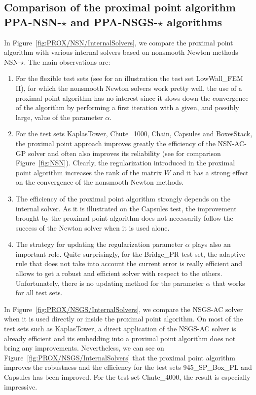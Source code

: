 \subsection{Comparison of the proximal point algorithm {\sf PPA-NSN-$\star$} and {\sf PPA-NSGS-$\star$}  algorithms}
\label{Sec:PROX/NSN/InternalSolvers}
In Figure~\ref{fig:PROX/NSN/InternalSolvers}, we compare the proximal point algorithm with various internal solvers based on nonsmooth Newton methods {\sf NSN-$\star$}. The main observations are:
\begin{enumerate}
\item For the flexible test sets (see for an illustration the test set LowWall\_FEM II), for which the nonsmooth Newton solvers work pretty well, the use of a proximal point algorithm has no interest since it slows down the convergence of the algorithm by performing a first iteration with a given, and possibly large, value of the parameter $\alpha$.
\item For the test sets KaplasTower,   Chute\_1000, Chain, Capsules and BoxesStack, the proximal point approach improves greatly the efficiency  of the {\sf NSN-AC-GP} solver and often also improves its reliability (see for comparison Figure~\ref{fig:NSN}). Clearly, the regularization introduced in the proximal point algorithm increases the rank of the matrix $W$ and it has a strong effect on the convergence of the nonsmooth  Newton methods.
\item The efficiency of the proximal point algorithm strongly depends on the internal solver. As it is illustrated on the Capsules test, the improvement brought by the proximal point algorithm does not necessarily follow the success of the Newton solver when it is used alone.
\item The strategy for updating the regularization parameter $\alpha$ plays also an important role. Quite surprisingly, for the Bridge\_PR test set, the adaptive rule that does not take into account the current error is really efficient and allows to get a robust and efficient solver with respect to the others. Unfortunately, there is no updating method for the parameter $\alpha$ that works for all test sets.
\end{enumerate}
In Figure~\ref{fig:PROX/NSGS/InternalSolvers}, we compare the {\sf NSGS-AC} solver when it is used directly or inside the proximal point algorithm. On most of the test sets such as KaplasTower, a direct application of the {\sf NSGS-AC} solver is already efficient and its embedding into a proximal point algorithm does not bring any improvements. Nevertheless, we can see on Figure~\ref{fig:PROX/NSGS/InternalSolvers} that the proximal point algorithm improves the robustness and the efficiency for the test sets 945\_SP\_Box\_PL  and Capsules has been improved. For the test set Chute\_4000, the result is especially impressive.

